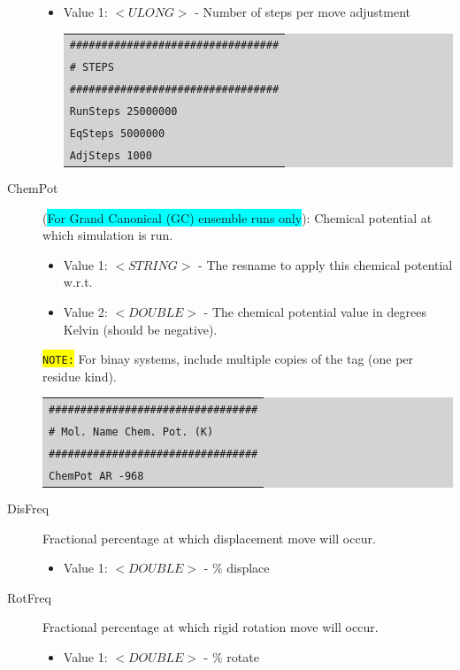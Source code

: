 \begin{description}
\begin{itemize}
	\item Value 1: $<ULONG>$ - Number of steps per move adjustment\\
	\colorbox{lightgray}{
	\begin{tabular}{l}
	\texttt{\#\#\#\#\#\#\#\#\#\#\#\#\#\#\#\#\#\#\#\#\#\#\#\#\#\#\#\#\#\#\#\#\#}\\
	\texttt{\# STEPS}\\
	\texttt{\#\#\#\#\#\#\#\#\#\#\#\#\#\#\#\#\#\#\#\#\#\#\#\#\#\#\#\#\#\#\#\#\#}\\
	\texttt{RunSteps           25000000}\\
	\texttt{EqSteps		   5000000}\\
	\texttt{AdjSteps	        1000}\\
	\end{tabular}}
	\end{itemize}
\item [ChemPot] (\colorbox{cyan}{For Grand Canonical (GC) ensemble runs only}): Chemical potential at which simulation is run.
	\begin{itemize}
	\item Value 1: $<STRING>$ - The resname to apply this chemical potential w.r.t.
	\item Value 2: $<DOUBLE>$ - The chemical potential value in degrees Kelvin (should be negative).
	\end{itemize}
	\colorbox{yellow}{\texttt{NOTE:}} For binay systems, include multiple copies of the tag (one per residue kind).\\
	\colorbox{lightgray}{
	\begin{tabular}{l}
	\texttt{\#\#\#\#\#\#\#\#\#\#\#\#\#\#\#\#\#\#\#\#\#\#\#\#\#\#\#\#\#\#\#\#\#}\\
	\texttt{\#  Mol. Name    Chem. Pot. (K)}\\
	\texttt{\#\#\#\#\#\#\#\#\#\#\#\#\#\#\#\#\#\#\#\#\#\#\#\#\#\#\#\#\#\#\#\#\#}\\
	\texttt{ChemPot        AR               -968}\\
	\end{tabular}}
\item [DisFreq] Fractional percentage at which displacement move will occur.
	\begin{itemize}
	\item Value 1: $<DOUBLE>$ - \% displace
	\end{itemize}
\item [RotFreq] Fractional percentage at which rigid rotation move will occur.
	\begin{itemize}
	\item Value 1: $<DOUBLE>$ - \% rotate

\end{itemize}
\end{description}
